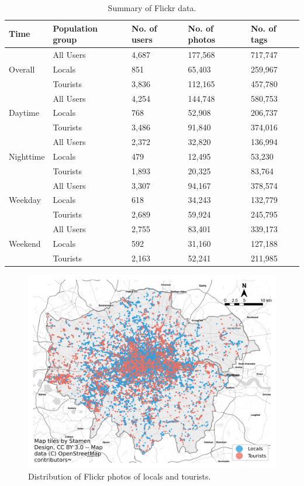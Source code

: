 \documentclass{article}
\begin{document}
\begin{table}[h!]
\centering
\caption{\label{tab:flickr_summary}Summary of Flickr data.}
\begin{tabular}{lllll} \hline
Time & Population group & No. of users & No. of photos & No. of tags \\
\hline
\multirow{3}{*}{Overall} 
& All Users & 4,687 & 177,568 & 717,747 \\
& Locals & 851 & 65,403 & 259,967 \\
& Tourists & 3,836 & 112,165 & 457,780 \\
\hline
\multirow{3}{*}{Daytime} 
& All Users & 4,254 & 144,748 & 580,753 \\
& Locals & 768 & 52,908 & 206,737 \\
& Tourists & 3,486 & 91,840 & 374,016 \\
\hline
\multirow{3}{*}{Nighttime} 
& All Users & 2,372 & 32,820 & 136,994 \\
& Locals & 479 & 12,495 & 53,230 \\
& Tourists & 1,893 & 20,325 & 83,764 \\
\hline
\multirow{3}{*}{Weekday} 
& All Users & 3,307 & 94,167 & 378,574 \\
& Locals & 618 & 34,243 & 132,779 \\
& Tourists & 2,689 & 59,924 & 245,795 \\
\hline
\multirow{3}{*}{Weekend} 
& All Users & 2,755 & 83,401 & 339,173 \\
& Locals & 592 & 31,160 & 127,188 \\
& Tourists & 2,163 & 52,241 & 211,985 \\
\hline
\end{tabular}
\end{table}

\begin{figure}[h!]
\centering
\includegraphics[width=1\textwidth]{figures/flickr_distribution.png}
\caption{\label{fig:flickr_distribution}Distribution of Flickr photos of locals and tourists.}
\end{figure}
\end{document}
